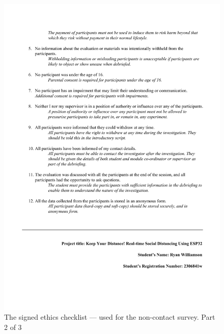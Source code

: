 \documentclass{l4proj}
\begin{document}
\begin{appendices}
    \begin{figure}[!htb]
        \centering
        \includegraphics[width=1.0\linewidth]{images/ethics_checklist_signed 2.pdf}

        \caption{ The signed ethics checklist — used for the non-contact survey. Part 2 of 3 }

        \label{fig:ethics_checklist2}
    \end{figure}


\end{appendices}
\end{document}
